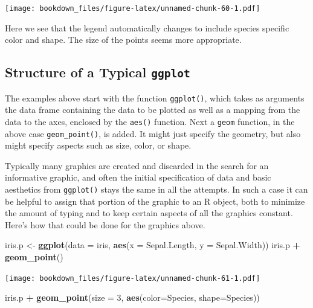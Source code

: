 \documentclass[]{krantz}
\makeatletter
\newenvironment{Shaded}{\begin{snugshade}}{\end{snugshade}}
\newcommand{\KeywordTok}[1]{\textcolor[rgb]{0.27,0.27,0.27}{\textbf{#1}}}
\newcommand{\DataTypeTok}[1]{\textcolor[rgb]{0.27,0.27,0.27}{#1}}
\newcommand{\DecValTok}[1]{\textcolor[rgb]{0.06,0.06,0.06}{#1}}
\newcommand{\StringTok}[1]{\textcolor[rgb]{0.5,0.5,0.5}{#1}}
\newcommand{\OperatorTok}[1]{\textcolor[rgb]{0.43,0.43,0.43}{\textbf{#1}}}
\newcommand{\NormalTok}[1]{#1}
\newenvironment{kframe}{%
\medskip{}
\setlength{\fboxsep}{.8em}
 \def\at@end@of@kframe{}%
 \ifinner\ifhmode%
  \def\at@end@of@kframe{\end{minipage}}%
  \begin{minipage}{\columnwidth}%
 \fi\fi%
 \def\FrameCommand##1{\hskip\@totalleftmargin \hskip-\fboxsep
 \colorbox{shadecolor}{##1}\hskip-\fboxsep
     \hskip-\linewidth \hskip-\@totalleftmargin \hskip\columnwidth}%
 \MakeFramed {\advance\hsize-\width
   \@totalleftmargin\z@ \linewidth\hsize
   \@setminipage}}%
 {\par\unskip\endMakeFramed%
 \at@end@of@kframe}
\renewenvironment{Shaded}{\begin{kframe}}{\end{kframe}}
\makeatother
\begin{document}
\texttt{[image: bookdown\_files/figure-latex/unnamed-chunk-60-1.pdf]}

Here we see that the legend automatically changes to include species
specific color and shape. The size of the points seems more appropriate.

\subsection{\texorpdfstring{Structure of a Typical
\texttt{ggplot}}{Structure of a Typical ggplot}}\label{structure-of-a-typical-ggplot}

The examples above start with the function \texttt{ggplot()}, which
takes as arguments the data frame containing the data to be plotted as
well as a mapping from the data to the axes, enclosed by the
\texttt{aes()} function. Next a \texttt{geom} function, in the above
case \texttt{geom\_point()}, is added. It might just specify the
geometry, but also might specify aspects such as size, color, or shape.

Typically many graphics are created and discarded in the search for an
informative graphic, and often the initial specification of data and
basic aesthetics from \texttt{ggplot()} stays the same in all the
attempts. In such a case it can be helpful to assign that portion of the
graphic to an R object, both to minimize the amount of typing and to
keep certain aspects of all the graphics constant. Here's how that could
be done for the graphics above.

\begin{Shaded}
\begin{Highlighting}[]
\NormalTok{iris.p <-}\StringTok{ }\KeywordTok{ggplot}\NormalTok{(}\DataTypeTok{data =}\NormalTok{ iris, }\KeywordTok{aes}\NormalTok{(}\DataTypeTok{x =}\NormalTok{ Sepal.Length, }\DataTypeTok{y =}\NormalTok{ Sepal.Width)) }
\NormalTok{iris.p }\OperatorTok{+}\StringTok{ }\KeywordTok{geom_point}\NormalTok{()}
\end{Highlighting}
\end{Shaded}

\texttt{[image: bookdown\_files/figure-latex/unnamed-chunk-61-1.pdf]}

\begin{Shaded}
\begin{Highlighting}[]
\NormalTok{iris.p }\OperatorTok{+}\StringTok{ }\KeywordTok{geom_point}\NormalTok{(}\DataTypeTok{size =} \DecValTok{3}\NormalTok{, }\KeywordTok{aes}\NormalTok{(}\DataTypeTok{color=}\NormalTok{Species, }\DataTypeTok{shape=}\NormalTok{Species))}
\end{Highlighting}
\end{Shaded}
\end{document}
